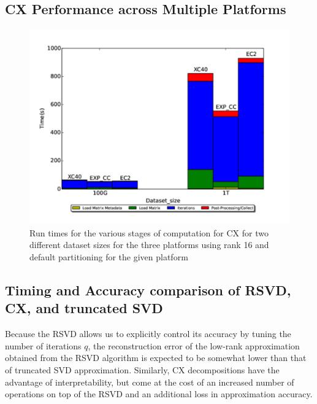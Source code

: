   \subsection{CX Performance across Multiple Platforms}
  \label{sect:h2h}
    
    \begin{figure} [H]
    \begin{centering}
    \includegraphics[scale=0.4]{images/CX_Size_Scaling_Rank_16_Partitions_default.pdf}
    \end{centering}
    \caption{ Run times for the various stages of computation for CX for two different dataset sizes for the three platforms using rank 16 and default partitioning for the given platform} 
    \label{fig:h2hrank16} 
    \end{figure}

    
  

  
  \subsection{Timing and Accuracy comparison of RSVD, CX, and truncated SVD}

 Because the RSVD allows us to explicitly control its accuracy by tuning the number of iterations $q$,
 the reconstruction error of the low-rank approximation obtained from the RSVD
 algorithm is expected to be somewhat lower than that of truncated SVD
 approximation. Similarly, CX decompositions have the advantage of
 interpretability, but come at the cost of an increased number of operations on
 top of the RSVD and an additional loss in approximation accuracy. 

